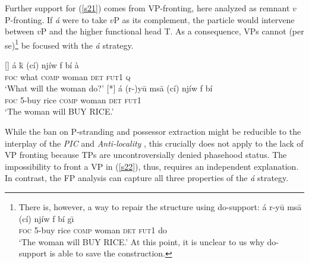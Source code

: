 \documentclass[output=paper,
modfonts
]{langscibook}
\begin{document}
Further support for (\ref{s21}) comes from VP-fronting, here analyzed as remnant $v$P-fronting. If {\em \'a} were to take $v$P as its complement, the particle would intervene between $v$P and the higher functional head T. As a consequence, VPs cannot (per se)\footnote{There is, however, a way to repair the structure using do-support:
\ea
\gll \'a {r-y\=u} {ms\=a} (c\'i) nj\'iw f b\'i {g\={\i}} \\ \textsc{foc} {{5}-buy} {rice} \textsc{comp} woman \textsc{det} \textsc{fut1} {do} \\ 
\glt `The woman will BUY RICE.'
\z
At this point, it is unclear to us why do-support is able to save the construction. %
} be focused with the {\em \'a} strategy.
\begin{exe}
\ex \label{s22}
	\begin{xlist}
		[]{ 
			\gll \'a k\=\textepsilon{} (c\'i) nj\'iw f b\'i \`a \\ 
			\textsc{foc} what \textsc{comp} woman \textsc{det} \textsc{fut1} \textsc{q}\\ 
			\glt `What will the woman do?'}
		[*]{ 
			\gll \'a {(r-)y\=u} {ms\=a} (c\'i) nj\'iw f b\'i \\ 
			\textsc{foc} 5-buy {rice} \textsc{comp} woman \textsc{det} \textsc{fut1}\\ 
			\glt `The woman will BUY RICE.'}
	\end{xlist}
\end{exe}
While the ban on P-stranding and possessor extraction might be reducible to the interplay of the {\em PIC} \citep{Chomsky2000} and {\em Anti-locality} \citep{Abels2003,Erlewine2016}, this crucially does not apply to the lack of VP fronting because TPs are uncontroversially denied phasehood status. The impossibility to front a VP in (\ref{s22}), thus, requires an independent explanation. In contrast, the FP analysis can capture all three properties of the {\em \'a} strategy.
\end{document}
